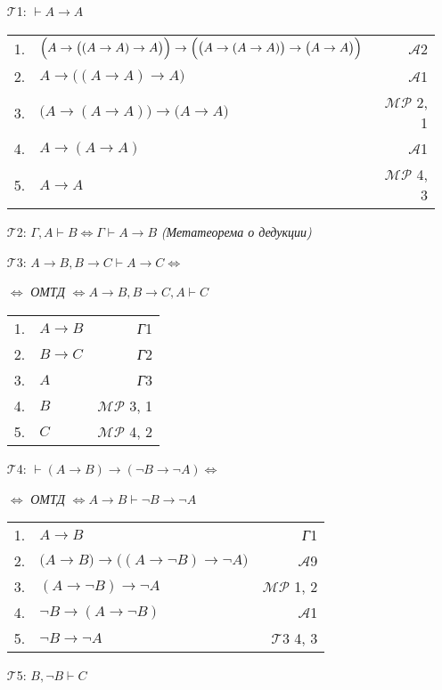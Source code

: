 \documentclass{article}
\begin{document}
\begin{enumerate}
\item[$\mathcal{T}$1:] $\vdash A\rightarrow A$

\begin{tabular}{llr}
1. & $\Bigl(A\rightarrow\bigl(\left(A\rightarrow A\right)\rightarrow A\bigr)\Bigr)\rightarrow\Bigl(\bigl(A\rightarrow\left(A\rightarrow A\right)\bigr)\rightarrow\bigl(A\rightarrow A\bigr)\Bigr)$ & $\mathcal{A}$2\\
2. & $A\rightarrow\bigl(\left(A\rightarrow A\right)\rightarrow A\bigr)$ & $\mathcal{A}$1\\
3. & $\bigl(A\rightarrow\left(A\rightarrow A\right)\bigr)\rightarrow\bigl(A\rightarrow A\bigr)$ & $\mathcal{MP}$ 2, 1\\
4. & $A\rightarrow\left(A\rightarrow A\right)$ & $\mathcal{A}$1\\
5. & $A\rightarrow A$ & $\mathcal{MP}$ 4, 3
\end{tabular}

\item[$\mathcal{T}$2:] $\Gamma, A\vdash B\Leftrightarrow\Gamma\vdash A\rightarrow B$ \textit{(Метатеорема о дедукции)}
\item[$\mathcal{T}$3:] $A\rightarrow B, B\rightarrow C\vdash A\rightarrow C \Leftrightarrow$

$\Leftrightarrow$ \textit{ОМТД} $\Leftrightarrow A\rightarrow B, B\rightarrow C, A \vdash C$

\begin{tabular}{llr}
1. & $A\rightarrow B$ & \textit{Г}1\\
2. & $B\rightarrow C$ & \textit{Г}2\\
3. & $A$ & \textit{Г}3\\
4. & $B$ & $\mathcal{MP}$ 3, 1\\
5. & $C$ & $\mathcal{MP}$ 4, 2
\end{tabular}
\vfill
\item[$\mathcal{T}$4:] $\vdash\left(A\rightarrow B\right)\rightarrow\left(\neg B\rightarrow\neg A\right) \Leftrightarrow$

$\Leftrightarrow$ \textit{ОМТД} $\Leftrightarrow A\rightarrow B\vdash \neg B\rightarrow \neg A$

\begin{tabular}{llr}
1. & $A\rightarrow B$ & \textit{Г}1\\
2. & $\bigl(A\rightarrow B\bigr)\rightarrow\bigl(\left(A\rightarrow\neg B\right)\rightarrow\neg A\bigr)$ & $\mathcal{A}$9\\
3. & $\left(A\rightarrow\neg B\right)\rightarrow\neg A$ & $\mathcal{MP}$ 1, 2\\
4. & $\neg B\rightarrow\left(A\rightarrow\neg B\right)$ & $\mathcal{A}$1\\
5. & $\neg B\rightarrow\neg A$ & $\mathcal{T}$3 4, 3
\end{tabular}
\item[$\mathcal{T}$5:] $B, \neg B\vdash C$


\end{enumerate}
\end{document}
